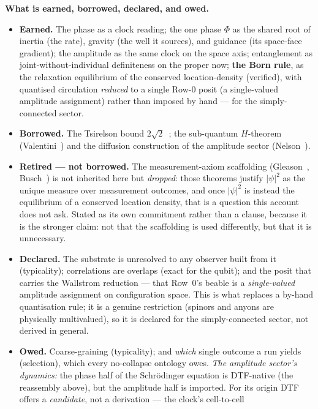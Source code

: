 \documentclass[11pt]{article}
\begin{document}
\textbf{What is earned, borrowed, declared, and owed.}
\begin{itemize}[leftmargin=1.4em,itemsep=2pt,topsep=3pt]
  \item \textbf{Earned.} The phase as a clock reading; the one phase $\Phi$ as the shared root of inertia
    (the rate), gravity (the well it sources), and guidance (its space-face gradient); the amplitude as
    the same clock on the space axis; entanglement as
    joint-without-individual definiteness on the proper now; \textbf{the Born rule}, as the relaxation
    equilibrium of the conserved location-density (verified), with quantised circulation
    \emph{reduced} to a single Row-0 posit (a single-valued amplitude assignment) rather than imposed by
    hand --- for the simply-connected sector.
  \item \textbf{Borrowed.} The Tsirelson bound $2\sqrt2$~\cite{Cirelson1980}; the sub-quantum $H$-theorem
    (Valentini~\cite{Valentini1991}) and the diffusion construction of the amplitude sector
    (Nelson~\cite{Nelson1966}).
  \item \textbf{Retired --- not borrowed.} The measurement-axiom scaffolding
    (Gleason~\cite{Gleason1957}, Busch~\cite{Busch2003}) is not inherited here but \emph{dropped}: those
    theorems justify $|\psi|^2$ as the unique measure over measurement outcomes, and once $|\psi|^2$ is
    instead the equilibrium of a conserved location density, that is a question this account does not
    ask. Stated as its own commitment rather than a clause, because it is the stronger claim: not that
    the scaffolding is used differently, but that it is unnecessary.
  \item \textbf{Declared.} The substrate is unresolved to any observer built from it (typicality);
    correlations are overlaps (exact for the qubit); and the posit that carries the Wallstrom reduction ---
    that Row~0's beable is a \emph{single-valued} amplitude assignment on configuration space. This is what
    replaces a by-hand quantisation rule; it is a genuine restriction (spinors and anyons are physically
    multivalued), so it is declared for the simply-connected sector, not derived in general.
  \item \textbf{Owed.} Coarse-graining (typicality); and \emph{which} single outcome a run yields
    (selection), which every no-collapse ontology owes. \emph{The amplitude sector's dynamics:} the phase
    half of the Schr\"odinger equation is DTF-native (the reassembly above), but the amplitude half is
    imported. For its origin DTF offers a \emph{candidate}, not a derivation --- the clock's cell-to-cell

\end{itemize}
\end{document}
